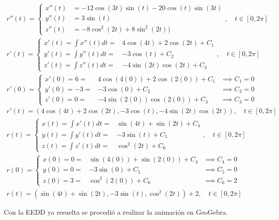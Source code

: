 \documentclass[letterpaper, 11pt]{extarticle}
\begin{document}
\begin{align}
r''(t)=\left\{\begin{matrix}
x''(t) &= -12\cos(3t)\sin(t)-20\cos(t)\sin(3t) \\
y''(t) &= 3\sin(t) \\
z''(t) &= -8\cos^2(2t)+8\sin^2(2t))
\end{matrix}\right., \quad t\in[0,2\pi] \label{e2} \\
r'(t)=\left\{\begin{matrix}
x'(t) = \int x''(t)dt =& 4\cos(4t)+2\cos(2t)+C_1 \\
y'(t) = \int y''(t)dt =& -3\cos(t)+C_2 \\
z'(t) = \int z''(t)dt =& -4\sin(2t)\cos(2t)+C_3
\end{matrix}\right., \quad t\in[0,2\pi]  \label{} \\
r'(0)=\left\{\begin{matrix}
x'(0) = 6 =& 4\cos(4(0))+2\cos(2(0))+C_1 &\implies C_1=0  \\
y'(0) = -3 =& -3\cos(0)+C_2 &\implies C_2=0\\
z'(0) = 0 =& -4\sin(2(0))\cos(2(0))+C_3 &\implies C_3=0
\end{matrix}\right. \label{} \\
r'(t)=(4\cos(4t)+2\cos(2t),-3\cos(t),-4\sin(2t)\cos(2t)), \quad t\in[0,2\pi] \label{}\\
r(t)=\left\{\begin{matrix}
x(t) = \int x'(t)dt =& \sin(4t)+\sin(2t)+C_4 \\
y(t) = \int y'(t)dt =& -3\sin(t)+C_5 \\
z(t) = \int z'(t)dt =& \cos^2(2t)+C_6
\end{matrix}\right., \quad t\in[0,2\pi]  \label{} \\
r(0)=\left\{\begin{matrix}
x(0) = 0 =& \sin(4(0))+\sin(2(0))+C_4 &\implies C_4=0  \\
y(0) = 0 =& -3\sin(0)+C_5 &\implies C_5=0\\
z(0) = 3 =& \cos^2(2(0))+C_6 &\implies C_6=2
\end{matrix}\right. \label{} \\
\boxed{r(t)=(\sin(4t)+\sin(2t),-3\sin(t),\cos^2(2t))+2, \quad t\in[0,2\pi]} \label{e3}
\end{align}

Con la EEDD ya resuelta se procedió a realizar la animación en GeoGebra.

\end{document}
